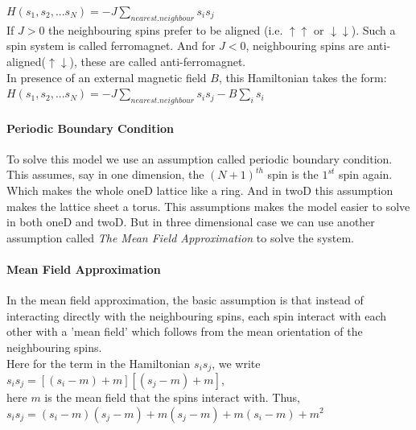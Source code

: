 \documentclass[20pt]{article}
\begin{document}
$H(s_1,s_2,...s_N)=-J \sum_{nearest.neighbour} s_i s_j$ \\


If $J>0$ the neighbouring spins prefer to be aligned (i.e. $ \uparrow \uparrow$ or $ \downarrow \downarrow$). Such a spin system is called ferromagnet. And for $J<0$, neighbouring spins are anti-aligned($\uparrow \downarrow$), these are called anti-ferromagnet.  \\
In presence of an external magnetic field $B$, this Hamiltonian takes the form:\\

$H(s_1,s_2,...s_N)=-J \sum_{nearest.neighbour} s_i s_j - B \sum_{i} s_i$

\paragraph{Periodic Boundary Condition \\}
To solve this model we use an assumption called periodic boundary condition. This assumes, say in one dimension, the $(N+1)^{th}$ spin is the $1^{st}$ spin again. Which makes the whole oneD lattice like a ring. And in twoD this assumption makes the  lattice sheet a torus. This assumptions makes the model easier to solve in both oneD and twoD. But in three dimensional case we can use another assumption called \textit{The Mean Field Approximation } to solve the system.\\

\paragraph{ Mean Field Approximation\\}
In the mean field approximation, the basic assumption is that instead of interacting directly with the neighbouring spins, each spin interact with each other with a 'mean field' which follows from the mean orientation of the neighbouring spins.\\

Here for the term in the Hamiltonian $s_i s_j$, we write\\

$s_i s_j = [(s_i - m)+m][(s_j - m)+ m]$,\\ 

here $m$ is the mean field that the spins interact with. Thus,\\


$s_i s_j  = (s_i - m)(s_j - m) + m(s_j - m) + m(s_i - m)+ m^2$ \\
\end{document}
